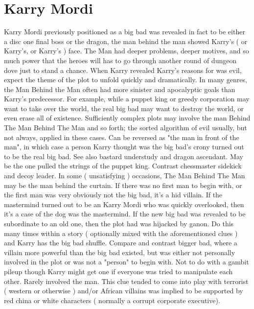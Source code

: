 \documentclass[12pt]{book}
\begin{document}
\chapter{Karry Mordi}

Karry Mordi previously positioned as a big bad was revealed in fact to be either a disc one final boss or the dragon, the man behind the man showed Karry's ( or Karry's, or Karry's ) face. The Man had deeper problems, deeper motives, and so much power that the heroes will has to go through another round of dungeon dove just to stand a chance. When Karry revealed Karry's reasons for was evil, expect the theme of the plot to unfold quickly and dramatically. In many genres, the Man Behind the Man often had more sinister and apocalyptic goals than Karry's predecessor. For example, while a puppet king or greedy corporation may want to take over the world, the real big bad may want to destroy the world, or even erase all of existence. Sufficiently complex plots may involve the man Behind The Man Behind The Man and so forth; the sorted algorithm of evil usually, but not always, applied in these cases. Can be reversed as "the man in front of the man", in which case a person Karry thought was the big bad's crony turned out to be the real big bad. See also bastard understudy and dragon ascendant. May be the one pulled the strings of the puppet king. Contrast chessmaster sidekick and decoy leader. In some ( unsatisfying ) occasions, The Man Behind The Man may be the man behind the curtain. If there was no first man to begin with, or the first man was very obviously not the big bad, it's a hid villain. If the mastermind turned out to be an Karry Mordi who was quickly overlooked, then it's a case of the dog was the mastermind. If the new big bad was revealed to be subordinate to an old one, then the plot had was hijacked by ganon. Do this many times within a story ( optionally mixed with the aforementioned clues ) and Karry has the big bad shuffle. Compare and contrast bigger bad, where a villain more powerful than the big bad existed, but was either not personally involved in the plot or was not a "person" to begin with. Not to do with a gambit pileup though Karry might get one if everyone was tried to manipulate each other. Rarely involved the man. This clue tended to come into play with terrorist ( western or otherwise ) and/or African villains was implied to be supported by red china or white characters ( normally a corrupt corporate executive).
\end{document}

